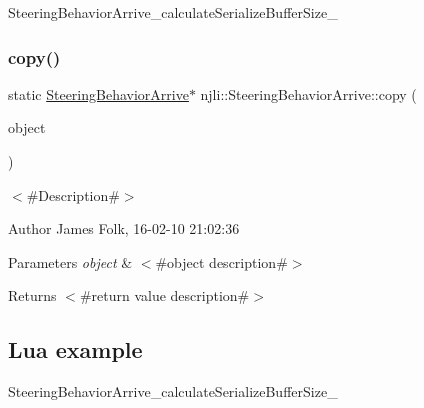 \begin{DoxyCodeInclude}
\end{DoxyCodeInclude}
Steering\+Behavior\+Arrive\+\_\+calculate\+Serialize\+Buffer\+Size\+\_\+ \mbox{\label{classnjli_1_1_steering_behavior_arrive_a2756ea4a6c57da84e9d76dafcd8ff0d1}} 
\subsubsection{\texorpdfstring{copy()}{copy()}}
{\footnotesize\ttfamily static \mbox{\hyperlink{classnjli_1_1_steering_behavior_arrive}{Steering\+Behavior\+Arrive}}$\ast$ njli\+::\+Steering\+Behavior\+Arrive\+::copy (\begin{DoxyParamCaption}\item[{const \mbox{\hyperlink{classnjli_1_1_steering_behavior_arrive}{Steering\+Behavior\+Arrive}} \&}]{object }\end{DoxyParamCaption})\hspace{0.3cm}{\ttfamily [static]}}



$<$\#\+Description\#$>$ 

\begin{DoxyAuthor}{Author}
James Folk, 16-\/02-\/10 21\+:02\+:36
\end{DoxyAuthor}

\begin{DoxyParams}{Parameters}
{\em object} & $<$\#object description\#$>$\\
\hline
\end{DoxyParams}
\begin{DoxyReturn}{Returns}
$<$\#return value description\#$>$
\end{DoxyReturn}
\hypertarget{classnjli_1_1_steering_behavior_wander_ex1}{}\subsection{Lua example}\label{classnjli_1_1_steering_behavior_wander_ex1}

\begin{DoxyCodeInclude}
\end{DoxyCodeInclude}
Steering\+Behavior\+Arrive\+\_\+calculate\+Serialize\+Buffer\+Size\+\_\+ \mbox{\label{classnjli_1_1_steering_behavior_arrive_ab5cf89afc4d132c4558e4959c29eea7c}} 
